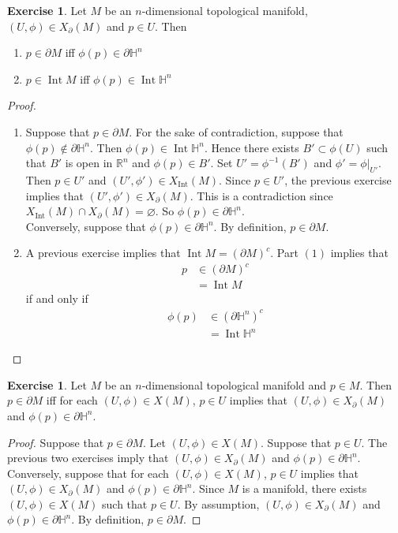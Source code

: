 \documentclass{book}
\theoremstyle{definition}
\newtheorem{ex}[definition]{Exercise}
\renewcommand{\H}{\mathbb{H}}
\newcommand{\R}{\mathbb{R}}
\DeclareMathOperator{\Int}{Int}
\DeclareMathOperator*{\0}{\mbf{0}}
\DeclareMathOperator*{\1}{\mbf{1}}
\newcommand{\p}{\partial}
\begin{document}
	\begin{ex}
		Let $M$ be an $n$-dimensional topological manifold, $(U, \phi) \in X_{\p}(M)$ and $p \in U$. Then 
		\begin{enumerate}
			\item $p \in \p M$ iff $\phi(p) \in \p \H^n$
			\item $p \in \Int M$ iff $\phi(p) \in \Int \H^n$
		\end{enumerate}
	\end{ex}

	\begin{proof}\
		\begin{enumerate}
			\item Suppose that $p \in \p M$. For the sake of contradiction, suppose that $\phi(p) \not \in \p \H^n$. Then $\phi(p) \in \Int \H^n$. Hence there exists $B' \subset \phi(U)$ such that $B'$ is open in $\R^n$ and $\phi(p) \in B'$. Set $U' = \phi^{-1}(B')$ and $\phi' = \phi|_{U'}$. Then $p \in U'$ and $(U', \phi') \in X_{\Int}(M)$. Since $p \in U'$, the previous exercise implies that $(U', \phi') \in X_{\p}(M)$. This is a contradiction since $X_{\Int}(M) \cap X_{\p}(M) = \varnothing$. So $\phi(p) \in \p \H^n$.\\
			Conversely, suppose that $\phi(p) \in \p \H^n$. By definition, $p \in \p M$.
			\item A previous exercise implies that $\Int M = (\p M)^c$. Part $(1)$ implies that 
			\begin{align*}
				p
				& \in (\p M)^c \\
				& = \Int M
			\end{align*}
			if and only if
			\begin{align*}
				\phi(p)
				& \in (\p \H^n)^c \\
				& = \Int \H^n
			\end{align*}
		\end{enumerate}
	\end{proof}

	\begin{ex}
		Let $M$ be an $n$-dimensional topological manifold and $p \in M$. Then $p \in \p M$ iff for each $(U, \phi) \in X(M)$, $p \in U$ implies that $(U, \phi) \in X_{\p}(M)$ and $\phi(p) \in \partial \H^n$. \\
	\end{ex}

	\begin{proof}
		Suppose that $p \in \partial M$. Let $(U, \phi) \in X(M)$. Suppose that $p \in U$. The previous two exercises imply that $(U, \phi) \in X_{\p}(M)$ and $\phi(p) \in \p \H^n$.\\
		Conversely, suppose that for each $(U, \phi) \in X(M)$, $p \in U$ implies that $(U, \phi) \in X_{\p}(M)$ and $\phi(p) \in \partial \H^n$. Since $M$ is a manifold, there exists $(U, \phi) \in X(M)$ such that $p \in U$. By assumption, $(U, \phi) \in X_{\p}(M)$ and $\phi(p) \in \p \H^n$. By definition, $p \in \p M$.
	\end{proof} 
	
\end{document}
